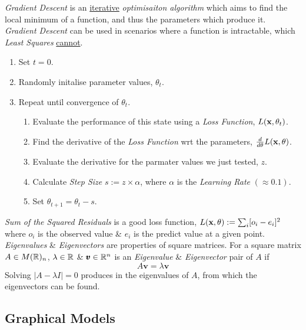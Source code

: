 \documentclass[11pt,a4paper]{article}
\begin{document}
\textit{Gradient Descent} is an \underline{iterative} \textit{optimisaiton algorithm} which aims to find the local minimum of a function, and thus the parameters which produce it.\\
\textit{Gradient Descent} can be used in scenarios where a function is intractable, which \textit{Least Squares} \underline{cannot}.
\begin{enumerate}
	\item Set $t=0$.
	\item Randomly initalise parameter values, $\theta_t$.
	\item Repeat until convergence of $\theta_t$.
	\begin{enumerate}
		\item Evaluate the performance of this state using a \textit{Loss Function}, $L(\textbf{x},\theta_t)$.
		\item Find the derivative of the \textit{Loss Function} wrt the parameters, $\frac{d}{d\theta}L(\textbf{x},\theta)$.
		\item Evaluate the derivative for the parmater values we just tested, $z$.
		\item Calculate \textit{Step Size} $s:=z\times\alpha$, where $\alpha$ is the \textit{Learning Rate} $(\approx 0.1)$.
		\item Set $\theta_{t+1}=\theta_t-s$.
	\end{enumerate}
\end{enumerate}
\nb \textit{Sum of the Squared Residuals} is a good loss function, $L(\textbf{x},\theta):=\sum_i[o_i-e_i]^2$ where $o_i$ is the observed value \& $e_i$ is the predict value at a given point.\\

\textit{Eigenvalues} \& \textit{Eigenvectors} are properties of square matrices. For a square matrix $A\in M(\mathbb{R})_n$, $\lambda\in\mathbb{R}$ \& $\pmb{v}\in\mathbb{R}^n$ is an \textit{Eigenvalue} \& \textit{Eigenvector} pair of $A$ if
$$A\pmb{v}=\lambda\pmb{v}$$
\nb Solving $|A-\lambda I|=0$ produces in the eigenvalues of $A$, from which the eigenvectors can be found.\\

\subsection{Graphical Models}
\end{document}
